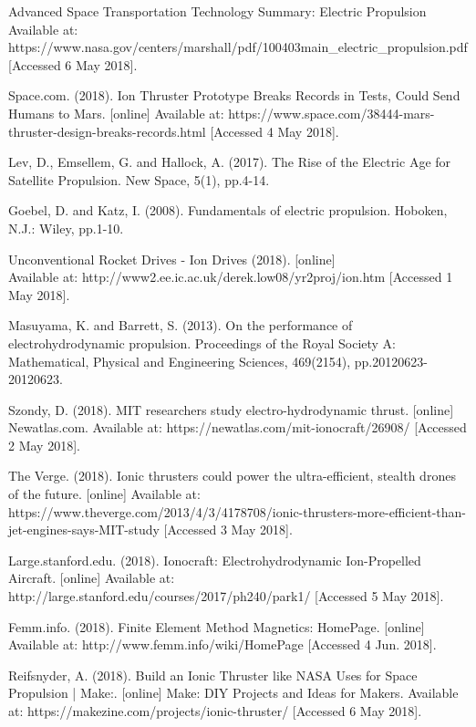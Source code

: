 \documentclass[11pt]{article}
\begin{document}
\begin{thebibliography}{9}

Advanced Space Transportation Technology Summary: Electric Propulsion Available at: https://www.nasa.gov/centers/marshall/pdf/100403main\_electric\_propulsion.pdf [Accessed 6 May 2018].

Space.com. (2018). Ion Thruster Prototype Breaks Records in Tests, Could Send Humans to Mars. [online] Available at: https://www.space.com/38444-mars-thruster-design-breaks-records.html [Accessed 4 May 2018].

Lev, D., Emsellem, G. and Hallock, A. (2017). The Rise of the Electric Age for Satellite Propulsion. New Space, 5(1), pp.4-14.

Goebel, D. and Katz, I. (2008). Fundamentals of electric propulsion. Hoboken, N.J.: Wiley, pp.1-10.

Unconventional Rocket Drives - Ion Drives (2018). [online]\\
Available at: http://www2.ee.ic.ac.uk/derek.low08/yr2proj/ion.htm [Accessed 1 May 2018].

Masuyama, K. and Barrett, S. (2013). On the performance of electrohydrodynamic propulsion. Proceedings of the Royal Society A: Mathematical, Physical and Engineering Sciences, 469(2154), pp.20120623-20120623.

Szondy, D. (2018). MIT researchers study electro-hydrodynamic thrust. [online] Newatlas.com. Available at: https://newatlas.com/mit-ionocraft/26908/ [Accessed 2 May 2018].

The Verge. (2018). Ionic thrusters could power the ultra-efficient, stealth drones of the future. [online] Available at: https://www.theverge.com/2013/4/3/4178708/ionic-thrusters-more-efficient-than-jet-engines-says-MIT-study [Accessed 3 May 2018].

Large.stanford.edu. (2018). Ionocraft: Electrohydrodynamic Ion-Propelled Aircraft. [online] Available at: http://large.stanford.edu/courses/2017/ph240/park1/ [Accessed 5 May 2018].

Femm.info. (2018). Finite Element Method Magnetics: HomePage. [online] Available at: http://www.femm.info/wiki/HomePage [Accessed 4 Jun. 2018].

Reifsnyder, A. (2018). Build an Ionic Thruster like NASA Uses for Space Propulsion | Make:. [online] Make: DIY Projects and Ideas for Makers. Available at: https://makezine.com/projects/ionic-thruster/ [Accessed 6 May 2018].


\end{thebibliography}
\end{document}
